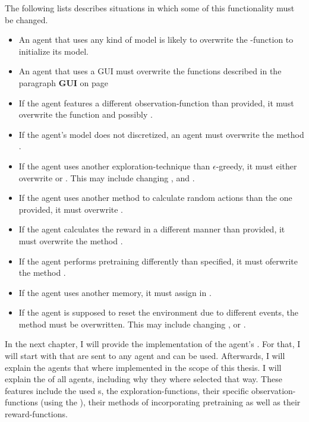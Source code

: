 The following lists describes situations in which some of this functionality must be changed.
\begin{itemize}[noitemsep]
	\item An agent that uses any kind of model is likely to overwrite the -function to initialize its model. 
	\item An agent that uses a GUI must overwrite the functions described in the paragraph \textbf{GUI} on page \pageref{paragraph:gui}
	\item If the agent features a different observation-function than provided, it must overwrite the function  and possibly . 
	\item If the agent's model does not discretized, an agent must overwrite the method .
	\item If the agent uses another exploration-technique than $\epsilon$-greedy, it must either overwrite  or . This may include changing ,  and .
	\item If the agent uses another method to calculate random actions than the one provided, it must overwrite .
	\item If the agent calculates the reward in a different manner than provided, it must overwrite the method .
	\item If the agent performs pretraining differently than specified, it must oferwrite the method .
	\item If the agent uses another memory, it must assign  in .
	\item If the agent is supposed to reset the environment due to different events, the method  must be overwritten. This may include changing ,  or .
\end{itemize}

In the next chapter, I will provide the implementation of the agent's . For that, I will start with  that are sent to any agent and can be used. Afterwards, I will explain the agents that where implemented in the scope of this thesis. I will explain the  of all agents, including why they where selected that way. These features include the used s, the exploration-functions, their specific observation-functions (using the ), their methods of incorporating pretraining as well as their reward-functions. 

